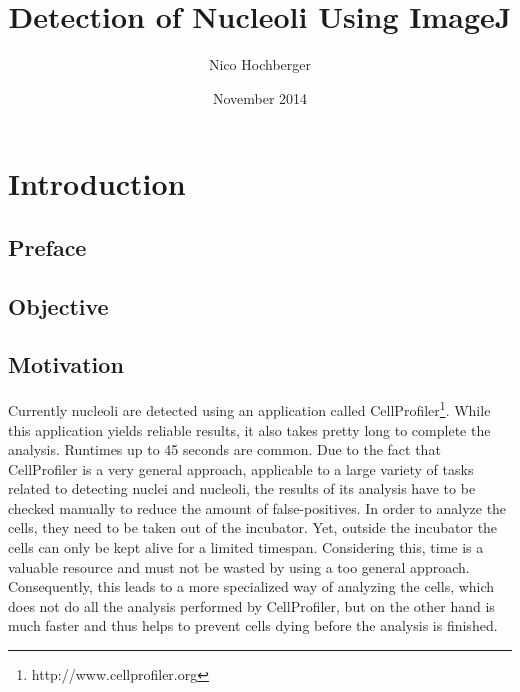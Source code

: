 \documentclass[a4paper, 11pt]{article}
\begin{document}


\title{Detection of Nucleoli Using ImageJ}
\author{Nico Hochberger}
\date{November 2014}
\maketitle

\newpage
\tableofcontents

\newpage
\section{Introduction}

\subsection{Preface}
 
\subsection{Objective}

\subsection{Motivation}
Currently nucleoli are detected using an application called
CellProfiler\footnote{http://www.cellprofiler.org}.
While this application yields reliable results, it also takes pretty long to complete
the analysis. Runtimes up to 45 seconds are common.
Due to the fact that CellProfiler is a very general approach, applicable to a
large variety of tasks related to detecting nuclei and nucleoli, the results of
its analysis have to be checked manually to reduce the amount of
false-positives.
In order to analyze the cells, they need to be taken out of the incubator. Yet,
outside the incubator the cells can only be kept alive for a limited timespan.
Considering this, time is a valuable resource and must not be wasted by using a
too general approach.
Consequently, this leads to a more specialized way of analyzing the cells, which
does not do all the analysis performed by CellProfiler, but on the other hand is
much faster and thus helps to prevent cells dying before the analysis is
finished.
\end{document}
